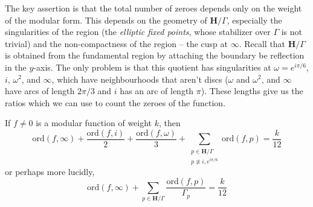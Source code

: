 The key assertion is that the total number of zeroes depends only on the weight of the modular form. This depends on the geometry of $\mathbf{H}/\Gamma$, especially the singularities of the region (the {\it elliptic fixed points}, whose stabilizer over $\Gamma$ is not trivial) and the non-compactness of the region -- the cusp at $\infty$. Recall that $\mathbf{H}/\Gamma$ is obtained from the fundamental region by attaching the boundary be reflection in the $y$-axis. The only problem is that this quotient has singularities at $\omega = e^{i \pi/6}$, $i$, $\omega^2$, and $\infty$, which have neighbourhoods that aren't discs ($\omega$ and $\omega^2$, and $\infty$ have arcs of length $2\pi/3$ and $i$ has an arc of length $\pi$). These lengths give us the ratios which we can use to count the zeroes of the function.

\begin{theorem}
    If $f \neq 0$ is a modular function of weight $k$, then
    \[ \text{ord}(f,\infty) + \frac{\text{ord}(f,i)}{2} + \frac{\text{ord}(f,\omega)}{3} + \sum_{\substack{p \in \mathbf{H}/\Gamma\\p \not \equiv i, e^{i \pi/6}}} \text{ord}(f,p) = \frac{k}{12} \]
    or perhaps more lucidly,
    \[ \text{ord}(f,\infty) + \sum_{p \in \mathbf{H}/\Gamma} \frac{\text{ord}(f,p)}{\Gamma_p} = \frac{k}{12} \]
\end{theorem}
